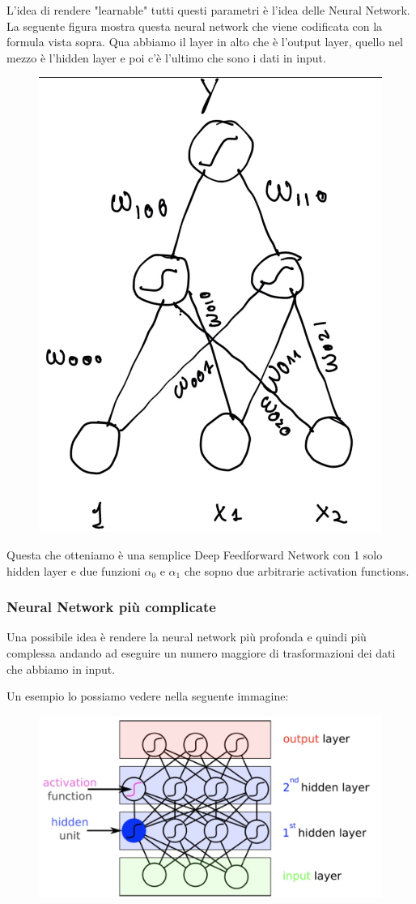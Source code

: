 \documentclass[14pt]{extreport}
\begin{document}
L'idea di rendere "learnable" tutti questi parametri è l'idea delle Neural Network. La seguente figura mostra questa neural network che viene
codificata con la formula vista sopra. Qua abbiamo il layer in alto che è l'output layer, quello nel mezzo è l'hidden layer e poi c'è l'ultimo che
sono i dati in input.

\begin{figure}[H]
\centering
\includegraphics[width=0.4\linewidth]{367.jpeg}
\end{figure}

Questa che otteniamo è una semplice Deep Feedforward Network con 1 solo hidden layer e due funzioni $\alpha_0$ e $\alpha_1$ che sopno due arbitrarie
activation functions.


\subsubsection{Neural Network più complicate}

Una possibile idea è rendere la neural network più profonda e quindi più complessa andando ad eseguire un numero maggiore di trasformazioni dei dati
che abbiamo in input.

Un esempio lo possiamo vedere nella seguente immagine:

\begin{figure}[H]
\centering
\includegraphics[width=0.5\linewidth]{368.jpeg}
\end{figure}
\end{document}
